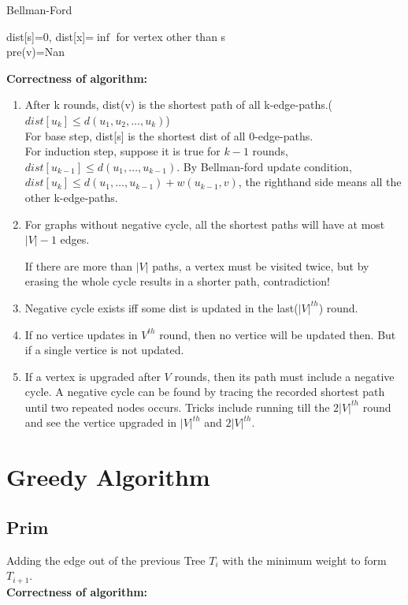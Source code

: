\documentclass{article}
\begin{document}
\begin{algorithm}
    \caption{Bellman-Ford}
    dist[s]=0, dist[x]=$\inf$ for vertex other than s\\
    pre(v)=Nan\\
\end{algorithm}
\textbf{Correctness of algorithm:}
\begin{enumerate}
    \item After k rounds, dist(v) is the shortest path of all k-edge-paths.($dist[u_k]\leq d(u_1,u_2,\ldots,u_k)$)\\
    For base step, dist[s] is the shortest dist of all 0-edge-paths.\\
    For induction step, suppose it is true for $k-1$ rounds, $dist[u_{k-1}] \leq d(u_1,\ldots,u_{k-1})$. By Bellman-ford update condition, $dist[u_{k}]\leq d(u_1,\ldots,u_{k-1})+w(u_{k-1},v)$, the righthand side means all the other k-edge-paths.
    \item For graphs without negative cycle, all the shortest paths will have at most $|V|-1$ edges.
    
    If there are more than $|V|$ paths, a vertex must be visited twice, but by erasing the whole cycle results in a shorter path, contradiction!
    \item Negative cycle exists iff some dist is updated in the last($|V|^{th}$) round.
    \item If no vertice updates in $V^{th}$ round, then no vertice will be updated then. But if a single vertice is not updated.
    \item If a vertex is upgraded after $V$ rounds, then its path must include a negative cycle.
    A negative cycle can be found by tracing the recorded shortest path until two repeated nodes occurs. Tricks include running till the $2|V|^{th}$ round and see the vertice upgraded in $|V|^{th}$ and $2|V|^{th}$.
\end{enumerate}

\section{Greedy Algorithm}
\subsection{Prim}
Adding the edge out of the previous Tree $T_i$ with the minimum weight to form $T_{i+1}$.\\
\textbf{Correctness of algorithm:}
\end{document}
